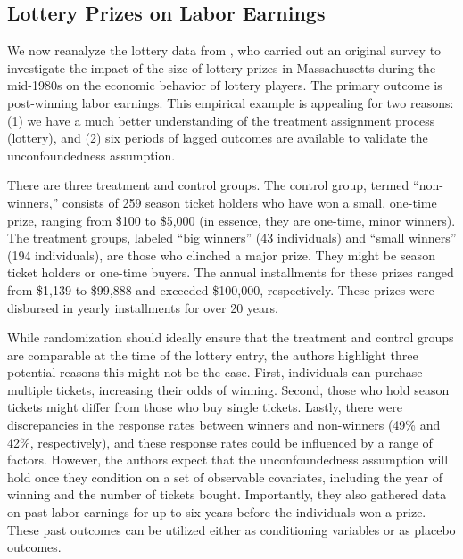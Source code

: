\documentclass[letterpaper,12pt,leqno]{article}
\begin{document}




\FloatBarrier

\subsection{Lottery Prizes on Labor Earnings}\label{re:irs}

We now reanalyze the lottery data from \citet*{imbensrubinsacerdote}, who carried out an original survey to investigate the impact of the size of lottery prizes in Massachusetts during the mid-1980s on the economic behavior of lottery players. The primary outcome is post-winning labor earnings. This empirical example is appealing for two reasons: (1) we have a much better understanding of the treatment assignment process (lottery), and (2) six periods of lagged outcomes are available to validate the unconfoundedness assumption.

There are three treatment and control groups. The control group, termed ``non-winners,'' consists of 259 season ticket holders who have won a small, one-time prize, ranging from \$100 to \$5,000 (in essence, they are one-time, minor winners). The treatment groups, labeled ``big winners'' (43 individuals) and ``small winners'' (194 individuals), are those who clinched a major prize. They might be season ticket holders or one-time buyers. The annual installments for these prizes ranged from \$1,139 to \$99,888 and exceeded \$100,000, respectively. These prizes were disbursed in yearly installments for over 20 years. 

While randomization should ideally ensure that the treatment and control groups are comparable at the time of the lottery entry, the authors highlight three potential reasons this might not be the case. First, individuals can purchase multiple tickets, increasing their odds of winning. Second, those who hold season tickets might differ from those who buy single tickets. Lastly, there were discrepancies in the response rates between winners and non-winners (49\% and 42\%, respectively), and these response rates could be influenced by a range of factors. However, the authors expect that the unconfoundedness assumption will hold once they condition on a set of observable covariates, including the year of winning and the number of tickets bought. Importantly, they also gathered data on past labor earnings for up to six years before the individuals won a prize. These past outcomes can be utilized either as conditioning variables or as placebo outcomes.
\end{document}
